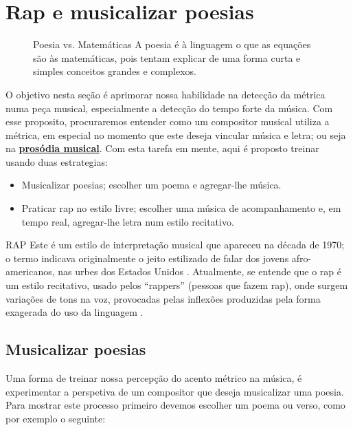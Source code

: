 \newpage
\section{Rap e musicalizar poesias}

\begin{figure}[b!]
\begin{FraseFernandoPR}{Poesia vs. Matemáticas}
A poesia é à linguagem o que as equações são às matemáticas,
pois tentam explicar de uma forma curta e simples conceitos grandes e complexos. %
\end{FraseFernandoPR}
\end{figure}

O objetivo nesta seção é aprimorar nossa habilidade na detecção da métrica numa peça musical,
especialmente a detecção do tempo forte da música.
Com esse proposito, procuraremos entender como um compositor musical utiliza a métrica,
em especial no momento que este deseja vincular música e letra;
ou seja na \hyperref[sec:ProsodiaMusical]{\textbf{prosódia musical}}. 
Com esta tarefa em mente, aqui é proposto treinar usando duas estrategias:
\begin{itemize}
\item Musicalizar poesias; escolher um poema e agregar-lhe música.
\item Praticar rap no estilo livre; escolher uma música de acompanhamento e, em tempo real, 
 agregar-lhe letra num estilo recitativo.
\end{itemize}


\begin{tcbinformation}{RAP}
\label{ref:RAP}
 Este é um estilo de interpretação musical que apareceu na década de 1970;
o termo indicava originalmente o jeito estilizado de falar dos jovens afro-americanos, 
nas urbes dos Estados Unidos  \cite[pp. 1250]{latham2008diccionario}.
Atualmente, se entende que o rap é um estilo recitativo,
usado pelos ``rappers'' (pessoas que fazem rap),
onde surgem variações de tons na voz, 
provocadas pelas inflexões produzidas pela forma exagerada do uso da linguagem \cite[pp. 1250]{latham2008diccionario}.
\end{tcbinformation} 


\subsection{Musicalizar poesias}
\label{subsec:musicalizarpoesias}
Uma forma de treinar nossa percepção do acento métrico na música, 
é experimentar a perspetiva de um compositor que deseja musicalizar uma poesia.
Para mostrar este processo primeiro devemos escolher um poema ou verso,
como por exemplo o seguinte:

